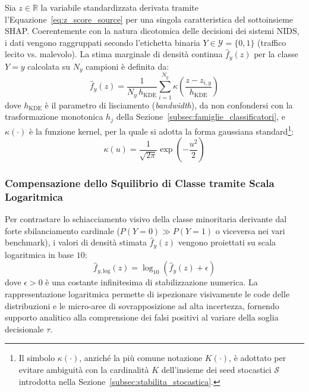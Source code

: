 Sia $z \in \mathbb{R}$ la variabile standardizzata derivata tramite l'Equazione~\eqref{eq:z_score_source} per una singola caratteristica del sottoinsieme SHAP. Coerentemente con la natura dicotomica delle decisioni dei sistemi NIDS, i dati vengono raggruppati secondo l'etichetta binaria $Y \in \mathcal{Y} = \{0, 1\}$ (traffico lecito vs. malevolo). La stima marginale di densità continua $\hat{f}_y(z)$ per la classe $Y=y$ calcolata su $N_y$ campioni è definita da:
\begin{equation}
    \hat{f}_y(z) = \frac{1}{N_y \, h_{\text{KDE}}} \sum_{i=1}^{N_y} \kappa\left( \frac{z - z_{i,y}}{h_{\text{KDE}}} \right)
    \label{eq:kde_univariate}
\end{equation}
dove $h_{\text{KDE}}$ è il parametro di lisciamento (\textit{bandwidth}), da non confondersi con la trasformazione monotonica $h_j$ della Sezione~\ref{subsec:famiglie_classificatori}, e $\kappa(\cdot)$ è la funzione kernel, per la quale si adotta la forma gaussiana standard\footnote{Il simbolo $\kappa(\cdot)$, anziché la più comune notazione $K(\cdot)$, è adottato per evitare ambiguità con la cardinalità $K$ dell'insieme dei seed stocastici $\mathcal{S}$ introdotta nella Sezione~\ref{subsec:stabilita_stocastica}.}:
\begin{equation}
    \kappa(u) = \frac{1}{\sqrt{2\pi}} \exp\left( -\frac{u^2}{2} \right)
    \label{eq:gaussian_kernel}
\end{equation}

\subsubsection{Compensazione dello Squilibrio di Classe tramite Scala Logaritmica}
\label{subsubsec:log_scale_kde}
Per contrastare lo schiacciamento visivo della classe minoritaria derivante dal forte sbilanciamento cardinale ($P(Y=0) \gg P(Y=1)$ o viceversa nei vari benchmark), i valori di densità stimata $\hat{f}_y(z)$ vengono proiettati su scala logaritmica in base $10$:
\begin{equation}
    \hat{f}_{y,\text{log}}(z) = \log_{10}\left( \hat{f}_y(z) + \epsilon \right)
    \label{eq:kde_log}
\end{equation}
dove $\epsilon > 0$ è una costante infinitesima di stabilizzazione numerica. La rappresentazione logaritmica permette di ispezionare visivamente le code delle distribuzioni e le micro-aree di sovrapposizione ad alta incertezza, fornendo supporto analitico alla comprensione dei falsi positivi al variare della soglia decisionale $\tau$.


